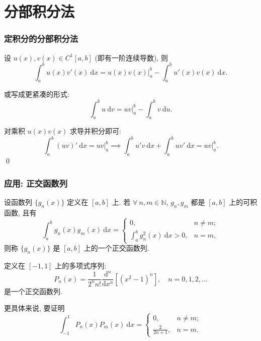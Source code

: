 
\section{分部积分法}


\begin{frame}
\frametitle{定积分的分部积分法}

\begin{thm}[分部积分法]
设 $u(x), v(x) \in C^1[a, b]$ (即有一阶连续导数), 则
\[ \int_a^b u(x) v'(x) ~ \mathrm{d}x = \left. u(x)v(x) \right|_a^b - \int_a^b u'(x) v(x) ~ \mathrm{d}x. \]

\pause
或写成更紧凑的形式:
\[ \int_a^b u ~ \mathrm{d}v = \left. uv \right|_a^b - \int_a^b v ~ \mathrm{d}u. \]
\end{thm}

\vspace{1em}
\startproof[bg=yellow, fg=red]
对乘积 $u(x)v(x)$ 求导并积分即可:
\[ \int_a^b (uv)' ~ \mathrm{d}x = \left. uv \right|_a^b \implies \int_a^b u'v ~ \mathrm{d}x + \int_a^b uv' ~ \mathrm{d}x = \left. uv \right|_a^b. \]
\qed

\end{frame}


\begin{frame}
\frametitle{应用: 正交函数列}

\begin{Def}[正交函数列]
设函数列 $\{g_n(x)\}$ 定义在 $[a, b]$ 上. 若 $\forall ~ n, m \in \mathbb{N}$, $g_n, g_m$ 都是 $[a, b]$ 上的可积函数, 且有
\[
\int_a^b g_n(x) g_m(x) ~ \mathrm{d}x = \begin{cases} 0, & n \neq m; \\ \int_a^b g_n^2(x) ~ \mathrm{d}x > 0, & n = m, \end{cases}
\]
则称 $\{g_n(x)\}$ 是 $[a, b]$ 上的一个\alert{正交函数列}.
\end{Def}

\pause

\begin{eg}
定义在 $[-1, 1]$ 上的多项式序列:
\[ P_n(x) = \frac{1}{2^n n!} \frac{\mathrm{d}^n}{\mathrm{d}x^n} \left[ (x^2-1)^n \right], \quad n=0,1,2,\dots \]
是一个正交函数列.
\end{eg}

\pause

更具体来说, 要证明
\[
\int_{-1}^1 P_n(x) P_m(x) ~ \mathrm{d}x = \begin{cases} 0, & n \neq m; \\ \frac{2}{2n+1}, & n = m. \end{cases}
\]

\end{frame}

